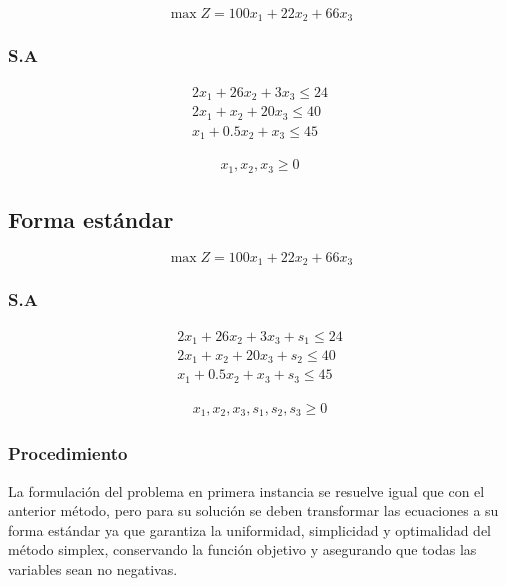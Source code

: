 \documentclass[conference]{IEEEtran}
\begin{document}
\begin{equation*}
    \max Z = 100x_{1} + 22x_{2} + 66x_{3}
\end{equation*}

\subsubsection*{S.A}

\begin{align*}
    2x_{1} + 26x_{2} + 3x_{3} \leq 24 \\
    2x_{1} + x_{2} + 20x_{3} \leq 40  \\
    x_{1} + 0.5x_{2} + x_{3} \leq 45
\end{align*}

\begin{align*}
    x_{1}, x_{2}, x_{3} \geq 0
\end{align*}

\subsection*{Forma estándar}

\begin{equation*}
    \max Z = 100x_{1} + 22x_{2} + 66x_{3}
\end{equation*}

\subsubsection*{S.A}

\begin{align*}
    2x_{1} + 26x_{2} + 3x_{3} + s_{1} \leq 24 \\
    2x_{1} + x_{2} + 20x_{3}  + s_{2} \leq 40 \\
    x_{1} + 0.5x_{2} + x_{3}  + s_{3} \leq 45
\end{align*}

\begin{align*}
    x_{1}, x_{2}, x_{3}, s_{1}, s_{2}, s_{3} \geq 0
\end{align*}

\subsubsection*{Procedimiento}

La formulación del problema en primera instancia se resuelve igual
que con el anterior método, pero para su solución se deben transformar
las ecuaciones a su forma estándar ya que garantiza la uniformidad,
simplicidad y optimalidad del método simplex, conservando la función
objetivo y asegurando que todas las variables sean no negativas.
\end{document}
